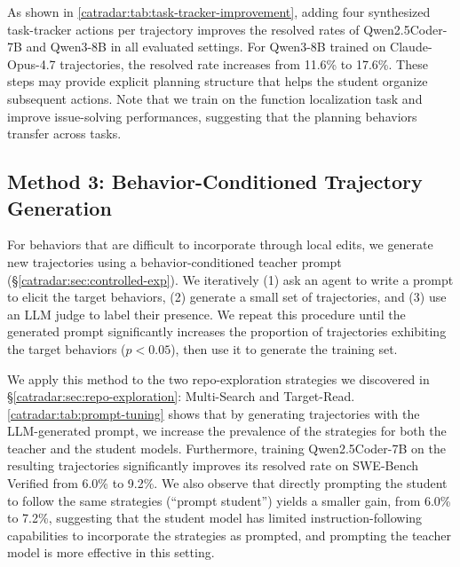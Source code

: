 As shown in \autoref{catradar:tab:task-tracker-improvement}, adding four synthesized task-tracker actions per trajectory improves the resolved rates of Qwen2.5Coder-7B and Qwen3-8B in all evaluated settings.
For Qwen3-8B trained on Claude-Opus-4.7 trajectories, the resolved rate increases from 11.6\% to 17.6\%.
These steps may provide explicit planning structure that helps the student organize subsequent actions.
Note that we train on the function localization task and improve issue-solving performances, suggesting that the planning behaviors transfer across tasks.


\subsection{Method 3: Behavior-Conditioned Trajectory Generation}
\label{catradar:sec:prompt-tuning}

For behaviors that are difficult to incorporate through local edits, we generate new trajectories using a behavior-conditioned teacher prompt (\S\ref{catradar:sec:controlled-exp}).
We iteratively (1) ask an agent to write a prompt to elicit the target behaviors, (2) generate a small set of trajectories, and (3) use an LLM judge to label their presence.
We repeat this procedure until the generated prompt significantly increases the proportion of trajectories exhibiting the target behaviors ($p<0.05$), then use it to generate the training set.

We apply this method to the two repo-exploration strategies we discovered in \S\ref{catradar:sec:repo-exploration}: Multi-Search and Target-Read.
\autoref{catradar:tab:prompt-tuning} shows that by generating trajectories with the LLM-generated prompt, we increase the prevalence of the strategies for both the teacher and the student models.
Furthermore, training Qwen2.5Coder-7B on the resulting trajectories significantly improves its resolved rate on SWE-Bench Verified from 6.0\% to 9.2\%.
We also observe that directly prompting the student to follow the same strategies (``prompt student'') yields a smaller gain, from 6.0\% to 7.2\%, suggesting that the student model has limited instruction-following capabilities to incorporate the strategies as prompted, and prompting the teacher model is more effective in this setting.


